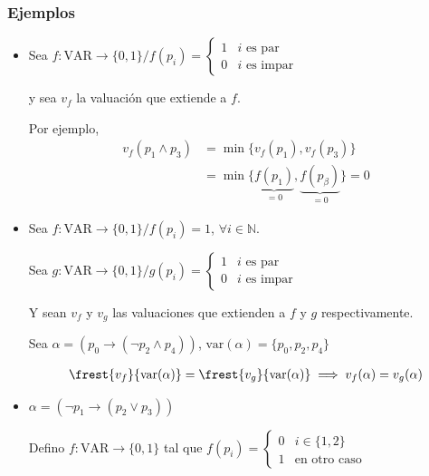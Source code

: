 \subsubsection{Ejemplos}

\begin{itemize}
    \item Sea $f: \mathrm{VAR} \to \{ 0,1 \} / f(p_i) =
        \begin{cases}
            1 & i \text{ es par} \\
            0 & i \text{ es impar}
        \end{cases}$

    y sea $v_f$ la valuación que extiende a $f$.


    Por ejemplo,
    \begin{align*}
        v_f(p_1 \wedge p_3) &= \min{\{ v_f(p_1), v_f(p_3)\}} \\
                            &= \min{\{ \underbrace{f(p_1)}_{=0},
                            \underbrace{f(p_\beta)}_{=0} \}} = 0
    \end{align*}


    \item Sea $f:\mathrm{VAR} \to \{ 0,1 \} / f(p_i) = 1$, $\forall i \in \mathbb{N}$. 
 
    Sea $g: \mathrm{VAR} \to \{ 0,1 \} / g(p_i) =
        \begin{cases}
            1 & i \text{ es par} \\
            0 & i \text{ es impar}
        \end{cases}$
 
    Y sean $v_f$ y $v_g$ las valuaciones que extienden a $f$ 
    y $g$ respectivamente.
 
    Sea $\alpha = (p_0 \to (\neg p_2 \wedge p_4))$, 
    $\mathrm{var}(\alpha) = \{ p_0,p_2,p_4 \}$

    \begin{gather*}
        \frest{v_f}{\mathrm{var}(\alpha)} = \frest{v_g}{\mathrm{var}(\alpha)} 
        \implies v_f(\alpha) = v_g(\alpha)
    \end{gather*}

     \item $\alpha = (\neg p_1 \to (p_2 \vee p_3))$

         Defino $f: \mathrm{VAR} \to \{ 0, 1 \}$ tal que
         $f(p_i) = \begin{cases}
             0 & i \in \{ 1, 2 \} \\
             1 & \text{en otro caso}
         \end{cases}$


\end{itemize}
